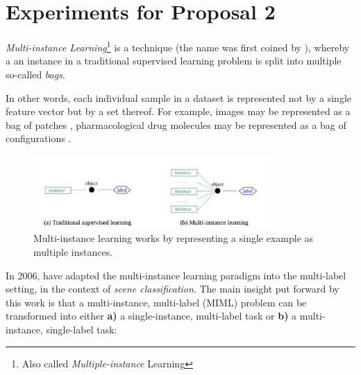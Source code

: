 \section{Experiments for Proposal 2}\label{section:experiment_part_2}

\textit{Multi-instance Learning}\footnote{Also called \textit{Multiple-instance} Learning} is a technique (the name was first coined by \cite{dietterich_etal_1997}), whereby a an  instance in a traditional supervised learning problem is split into multiple so-called \textit{bags}.

In other words, each individual sample in a dataset is represented not by a single feature vector but by a set thereof. For example, images may be represented as a bag of patches \citep{maron_ratan_98,andrews_etal_2003}, pharmacological drug molecules may be represented as a bag of configurations \citep{dietterich_etal_1997,andrews_etal_2003}.

\begin{figure}[H]
    \centering
    \includegraphics[width=0.8\textwidth]{chapters/05_experiments/images/miml1.png}
    \caption{Multi-instance learning works by representing a single example as multiple instances.}
    \label{fig:mimlsvm1}
\end{figure}

In 2006, \citeauthor{zhou_zhang_2006} have adapted the multi-instance learning paradigm into the multi-label setting, in the context of \textit{scene classification}. The main insight put forward by this work is that a multi-instance, multi-label (MIML) problem can be transformed into either \textbf{a)} a single-instance, multi-label task or \textbf{b)} a multi-instance, single-label task:

